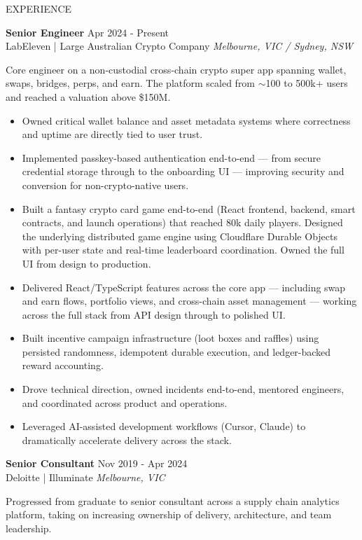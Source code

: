 \documentclass{resume} %
\begin{document}
\begin{rSection}{EXPERIENCE}

\textbf{Senior Engineer} \hfill Apr 2024 - Present\\
LabEleven | Large Australian Crypto Company \hfill \textit{Melbourne, VIC / Sydney, NSW}

Core engineer on a non-custodial cross-chain crypto super app spanning wallet, swaps, bridges, perps, and earn. The platform scaled from $\sim$100 to 500k+ users and reached a valuation above \$150M.

 \begin{itemize}
    \itemsep -3pt {}
    \item Owned critical wallet balance and asset metadata systems where correctness and uptime are directly tied to user trust.
    \item Implemented passkey-based authentication end-to-end — from secure credential storage through to the onboarding UI — improving security and conversion for non-crypto-native users.
    \item Built a fantasy crypto card game end-to-end (React frontend, backend, smart contracts, and launch operations) that reached 80k daily players. Designed the underlying distributed game engine using Cloudflare Durable Objects with per-user state and real-time leaderboard coordination. Owned the full UI from design to production.
    \item Delivered React/TypeScript features across the core app — including swap and earn flows, portfolio views, and cross-chain asset management — working across the full stack from API design through to polished UI.
    \item Built incentive campaign infrastructure (loot boxes and raffles) using persisted randomness, idempotent durable execution, and ledger-backed reward accounting.
    \item Drove technical direction, owned incidents end-to-end, mentored engineers, and coordinated across product and operations.
    \item Leveraged AI-assisted development workflows (Cursor, Claude) to dramatically accelerate delivery across the stack.
 \end{itemize}

\textbf{Senior Consultant} \hfill Nov 2019 - Apr 2024\\
Deloitte | Illuminate \hfill \textit{Melbourne, VIC}

Progressed from graduate to senior consultant across a supply chain analytics platform, taking on increasing ownership of delivery, architecture, and team leadership.


\end{rSection}
\end{document}
